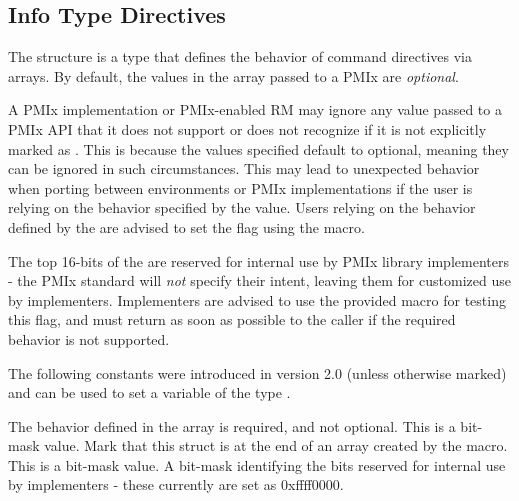 \subsection{Info Type Directives}

The  structure is a  type that defines the behavior of command directives via  arrays.
By default, the values in the  array passed to a PMIx are \emph{optional}.

\adviceuserstart
A PMIx implementation or PMIx-enabled \ac{RM} may ignore any  value passed to a \ac{PMIx} \ac{API} that it does not support or does not recognize if it is not explicitly marked as .
This is because the values specified default to optional, meaning they can be ignored in such circumstances.
This may lead to unexpected behavior when porting between environments or \ac{PMIx} implementations if the user is relying on the behavior specified by the  value.
Users relying on the behavior defined by the  are advised to set the  flag using the  macro.
\adviceuserend

\adviceimplstart
The top 16-bits of the  are reserved for internal use by \ac{PMIx} library implementers - the \ac{PMIx} standard will \textit{not} specify their intent, leaving them for customized use by implementers. Implementers are advised to use the provided  macro for testing this flag, and must return  as soon as possible to the caller if the required behavior is not supported.
\adviceimplend

The following constants were introduced in version 2.0 (unless otherwise marked) and can be used to set a variable of the type .

\begin{constantdesc}
%
The behavior defined in the  array is required, and not optional. This is a bit-mask value.
%
Mark that this  struct is at the end of an array created by the  macro. This is a bit-mask value.
%
A bit-mask identifying the bits reserved for internal use by implementers - these currently are set as 0xffff0000.
%
\end{constantdesc}

